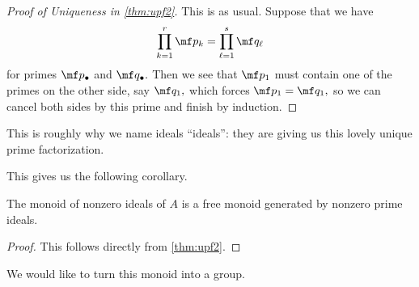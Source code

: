 \documentclass[../notes.tex]{subfiles}
\begin{document}
\begin{proof}[Proof of Uniqueness in \autoref{thm:upf2}]
    This is as usual. Suppose that we have
    \[\prod_{k=1}^r\mf p_k=\prod_{\ell=1}^s\mf q_\ell\]
    for primes $\mf p_\bullet$ and $\mf q_\bullet.$ Then we see that $\mf p_1$ must contain one of the primes on the other side, say $\mf q_1,$ which forces $\mf p_1=\mf q_1,$ so we can cancel both sides by this prime and finish by induction.
\end{proof}
\begin{remark}
    This is roughly why we name ideals ``ideals'': they are giving us this lovely unique prime factorization.
\end{remark}
This gives us the following corollary.
\begin{cor}
    The monoid of nonzero ideals of $A$ is a free monoid generated by nonzero prime ideals.
\end{cor}
\begin{proof}
    This follows directly from \autoref{thm:upf2}.
\end{proof}
We would like to turn this monoid into a group.
\end{document}
